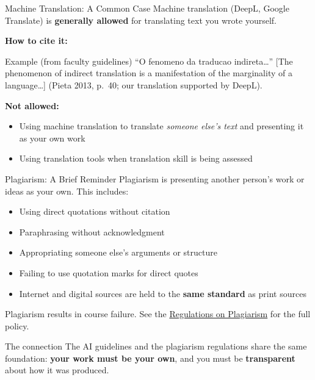 \documentclass[aspectratio=169,11pt]{beamer}
\begin{document}
\begin{frame}{Machine Translation: A Common Case}
    Machine translation (DeepL, Google Translate) is \textbf{generally allowed} for translating text you wrote yourself.
    \vspace{0.3cm}

    \textbf{How to cite it:}
    \vspace{0.2cm}

    \begin{exampleblock}{Example (from faculty guidelines)}
        \footnotesize
        ``O fenomeno da traducao indireta\ldots'' [The phenomenon of indirect translation is a manifestation of the marginality of a language\ldots] (Pieta 2013, p.~40; our translation supported by DeepL).
    \end{exampleblock}
    \vspace{0.3cm}

    \textbf{Not allowed:}
    \begin{itemize}
        \item Using machine translation to translate \textit{someone else's text} and presenting it as your own work
        \item Using translation tools when translation skill is being assessed
    \end{itemize}
\end{frame}

\begin{frame}{Plagiarism: A Brief Reminder}
    Plagiarism is presenting another person's work or ideas as your own. This includes:
    \vspace{0.3cm}
    \begin{itemize}
        \item Using direct quotations without citation
        \item Paraphrasing without acknowledgment
        \item Appropriating someone else's arguments or structure
        \item Failing to use quotation marks for direct quotes
        \item Internet and digital sources are held to the \textbf{same standard} as print sources
    \end{itemize}
    \vspace{0.3cm}
    Plagiarism results in course failure. See the \textcolor{SlateBlue}{\href{https://www.organisatiegids.universiteitleiden.nl/en/regulations/general/plagiarism}{Regulations on Plagiarism}} for the full policy.
    \vspace{0.3cm}

    \begin{block}{The connection}
        The AI guidelines and the plagiarism regulations share the same foundation: \textbf{your work must be your own}, and you must be \textbf{transparent} about how it was produced.
    \end{block}
\end{frame}
\end{document}
